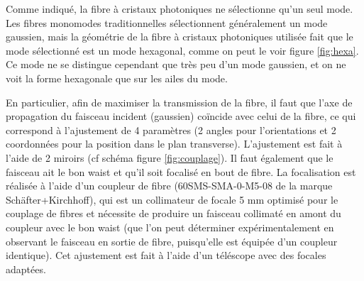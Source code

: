 \documentclass[11pt,a4paper]{article}
\begin{document}
Comme indiqué, la fibre à cristaux photoniques ne sélectionne qu'un seul mode. Les fibres monomodes traditionnelles sélectionnent généralement un mode gaussien, mais la géométrie de la fibre à cristaux photoniques utilisée fait que le mode sélectionné est un mode hexagonal, comme on peut le voir figure \ref{fig:hexa}. Ce mode ne se distingue cependant que très peu d'un mode gaussien, et on ne voit la forme hexagonale que sur les ailes du mode.

En particulier, afin de maximiser la transmission de la fibre, il faut que l'axe de propagation du faisceau incident (gaussien) coïncide avec celui de la fibre, ce qui correspond à l'ajustement de 4 paramètres (2 angles pour l'orientations et 2 coordonnées pour la position dans le plan transverse). L'ajustement est fait à l'aide de 2 miroirs (cf schéma figure \ref{fig:couplage}). Il faut également que le faisceau ait le bon waist et qu'il soit focalisé en bout de fibre. La focalisation est réalisée à l'aide d'un coupleur de fibre (60SMS-SMA-0-M5-08 de la marque Schäfter+Kirchhoff), qui est un collimateur de focale 5 mm optimisé pour le couplage de fibres et nécessite de produire un faisceau collimaté en amont du coupleur avec le bon waist (que l'on peut déterminer expérimentalement en observant le faisceau en sortie de fibre, puisqu'elle est équipée d'un coupleur identique). Cet ajustement est fait à l'aide d'un téléscope avec des focales adaptées.
\end{document}

